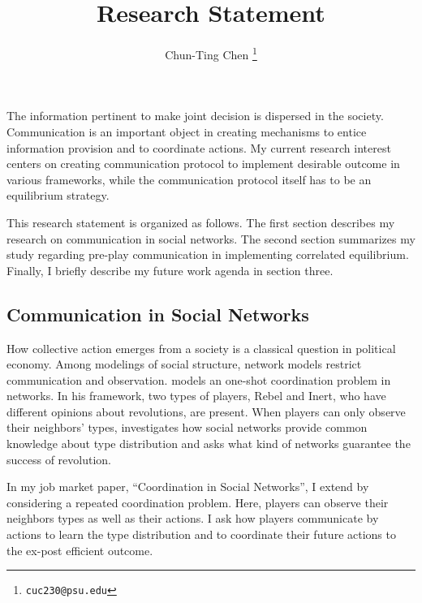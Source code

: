 \documentclass[12pt]{article}
\theoremstyle{definition}
\theoremstyle{remark}
\theoremstyle{claim}
\begin{document}

\title {Research Statement}
\author{Chun-Ting Chen%
  \thanks{\texttt{cuc230@psu.edu}}}

\date{}

\maketitle

The information pertinent to make joint decision is dispersed in the society. Communication is an important object in creating mechanisms to entice information provision and to coordinate actions. My current research interest centers on creating communication protocol to implement desirable outcome in various frameworks, while the communication protocol itself has to be an equilibrium strategy.

This research statement is organized as follows. The first section describes my research on communication in social networks. The second section summarizes my study regarding pre-play communication in implementing correlated equilibrium. Finally, I briefly describe my future work agenda in section three.



\subsection*{Communication in Social Networks}

How collective action emerges from a society is a classical question in political economy. Among modelings of social structure, network models restrict communication and observation. \citep{Chwe2000} models an one-shot coordination problem in networks. In his framework, two types of players, Rebel and Inert, who have different opinions about revolutions, are present. When players can only observe their neighbors' types, \citep{Chwe2000} investigates how social networks provide common knowledge about type distribution and asks what kind of networks guarantee the success of revolution.

In my job market paper, ``Coordination in Social Networks'', I extend \citep{Chwe2000} by considering a repeated coordination problem. Here, players can observe their neighbors types as well as their actions. I ask how players communicate by actions to learn the type distribution and to coordinate their future actions to the ex-post efficient outcome.
\end{document}
